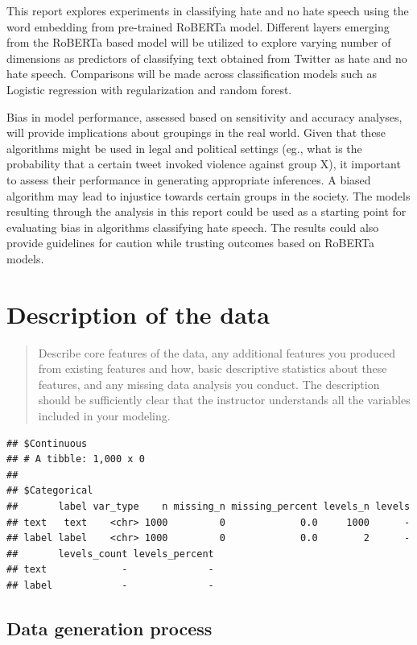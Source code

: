 \documentclass[
  english,
  man]{apa6}
\begin{document}
This report explores experiments in classifying hate and no hate speech using the word embedding from pre-trained RoBERTa model. Different layers emerging from the RoBERTa based model will be utilized to explore varying number of dimensions as predictors of classifying text obtained from Twitter as hate and no hate speech. Comparisons will be made across classification models such as Logistic regression with regularization and random forest.

Bias in model performance, assessed based on sensitivity and accuracy analyses, will provide implications about groupings in the real world. Given that these algorithms might be used in legal and political settings (eg., what is the probability that a certain tweet invoked violence against group X), it important to assess their performance in generating appropriate inferences. A biased algorithm may lead to injustice towards certain groups in the society. The models resulting through the analysis in this report could be used as a starting point for evaluating bias in algorithms classifying hate speech. The results could also provide guidelines for caution while trusting outcomes based on RoBERTa models.

\hypertarget{description-of-the-data}{%
\section{Description of the data}\label{description-of-the-data}}

\begin{quote}
Describe core features of the data, any additional features you produced from existing features and how, basic descriptive statistics about these features, and any missing data analysis you conduct. The description should be sufficiently clear that the instructor understands all the variables included in your modeling.
\end{quote}

\begin{verbatim}
## $Continuous
## # A tibble: 1,000 x 0
## 
## $Categorical
##       label var_type    n missing_n missing_percent levels_n levels
## text   text    <chr> 1000         0             0.0     1000      -
## label label    <chr> 1000         0             0.0        2      -
##       levels_count levels_percent
## text             -              -
## label            -              -
\end{verbatim}

\hypertarget{data-generation-process}{%
\subsection{Data generation process}\label{data-generation-process}}
\end{document}
